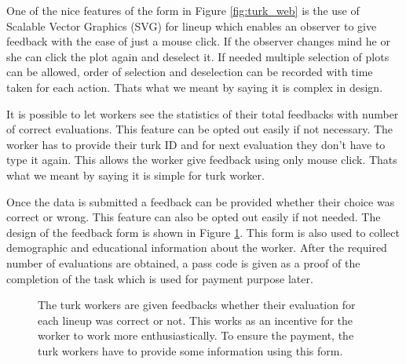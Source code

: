 \documentclass[11pt]{article}
\begin{document}
One of the nice features of the form in Figure \ref{fig:turk_web} is the use of Scalable Vector Graphics (SVG) for lineup which enables an observer to give feedback with the ease of just a mouse click. If the observer changes mind he or she can click the plot again and deselect it. If needed multiple selection of plots can be allowed, order of selection and deselection can be recorded with time taken for each action. Thats what we meant by saying it is complex in design. 

It is possible to let workers see the statistics of their total feedbacks with number of correct evaluations. This feature can be opted out easily if not necessary. The worker has to provide their turk ID and for next evaluation they don't have to type it again. This allows the worker give feedback using only mouse click. Thats what we meant by saying it is simple for turk worker.

Once the data is submitted a feedback can be provided whether their choice was correct or wrong. This feature can also be opted out easily if not needed. The design of the feedback form is shown in Figure \ref{fig:turk_web_feedback}. This form is also used to collect demographic and educational information about the worker. After the required number of evaluations are obtained, a pass code is given as a proof of the completion of the task which is used for payment purpose later.

\begin{figure}[hbtp]
   \centering
       \caption{The turk workers are given feedbacks whether their evaluation for each lineup was correct or not. This works as an incentive for the worker to work more enthusiastically. To ensure the payment, the turk workers have to provide some information using this form.}
       \label{fig:turk_web_feedback}
\end{figure}
\end{document}
